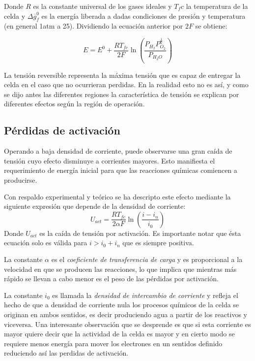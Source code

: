 Donde $R$ es la constante universal de los gases ideales y $T_fc$ la temperatura de la celda y $\Delta \overline{g}^{0}_{f}$
es la energía liberada a dadas condiciones de presión y temperatura (en general 1atm a 25\textcelsius). Dividiendo la
ecuación anterior por $2F$ se obtiene:

\begin{equation}
 E =  E^{0} + \frac{RT_{fc}}{2F}\ln(\frac{P_{H_2} P_{O_2}^\frac{1}{2}}{P_{H_2O}})
 \label{eq:tension_circuito_abierto}
\end{equation}

La tensión reversible representa la máxima tensión que es capaz de entregar la celda en el caso que no ocurrieran perdidas.
En la realidad esto no es así, y como se dijo antes las diferentes regiones la característica de tensión se explican por
diferentes efectos según la región de operación.

\subsection{Pérdidas de activación}
Operando a baja densidad de corriente, puede observarse una gran caída de tensión cuyo efecto disminuye a corrientes mayores.
Esto manifiesta el requerimiento de energía inicial para que las reacciones químicas comiencen a producirse.

Con respaldo experimental y teórico se ha descripto este efecto mediante la siguiente expresión que depende de la densidad
de corriente:
$$U_{act}=\frac{RT_{fc}}{2\alpha F}\ln(\frac{i-i_n}{i_0})$$
Donde $U_{act}$ es la caída de tensión por activación. Es importante notar que ésta ecuación solo es válida para 
$i>i_{0}+i_{n}$ que es siempre positiva.

La constante $\alpha$ es el \emph{coeficiente de transferencia de carga}
y es proporcional a la velocidad en que se producen las reacciones, lo que implica que mientras más rápido se llevan a cabo
menor es el peso de las pérdidas por activación.

La constante $i_{0}$ es llamada la \emph{densidad de intercambio de corriente} y refleja el hecho de que a densidad de
corriente nula los procesos químicos de la celda se originan en ambos sentidos, es decir produciendo agua a partir de 
los reactivos y viceversa. Una interesante observación que se desprende es que si esta corriente es mayor quiere decir
que la actividad de la celda es mayor y en cierto modo se requiere menos energía para mover los electrones en un sentidos
definido reduciendo así las perdidas de activación.

